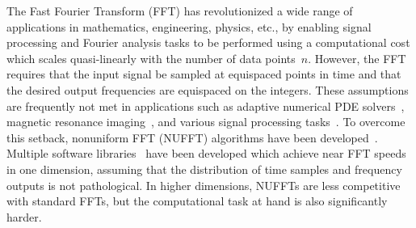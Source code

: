 
The Fast Fourier Transform (FFT) has revolutionized a wide range of applications
in mathematics, engineering, physics, etc., by enabling signal processing and
Fourier analysis tasks to be performed using a computational cost which scales
quasi-linearly with the number of data points~$n$. However, the FFT requires
that the input signal be sampled at equispaced points in time and that the
desired output frequencies are equispaced on the integers. These assumptions are
frequently not met in applications such as adaptive numerical PDE
solvers~\cite{}, magnetic resonance imaging~\cite{}, and various signal
processing tasks~\cite{}. To overcome this setback, nonuniform FFT (NUFFT)
algorithms have been developed~\cite{dutt1993fast,greengard2004accelerating}.
Multiple software libraries~\cite{barnett2019parallel} have been developed which
achieve near FFT speeds in one dimension, assuming that the distribution of time
samples and frequency outputs is not pathological. In higher dimensions, NUFFTs
are less competitive with standard FFTs, but the computational task at hand is
also significantly harder.

